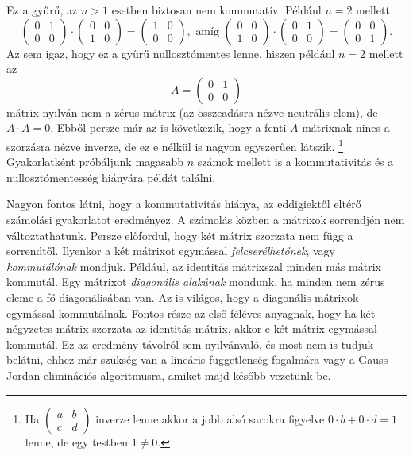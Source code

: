 \documentclass[9pt, showtrims]{memoir}
\theoremstyle{plain}
\theoremstyle{remark}
\theoremstyle{definition}
\begin{document}
Ez a gyűrű, az $n>1$ esetben biztosan nem kommutatív. 
Például $n=2$ mellett
\[
    \begin{pmatrix}
        0&1\\
        0&0
    \end{pmatrix}
    \cdot
    \begin{pmatrix}
        0&0\\
        1&0
    \end{pmatrix}
    =
    \begin{pmatrix}
        1&0\\
        0&0
    \end{pmatrix},
    \text{ amíg }
    \begin{pmatrix}
        0&0\\
        1&0
    \end{pmatrix}
    \cdot
    \begin{pmatrix}
        0&1\\
        0&0
    \end{pmatrix}
    =
    \begin{pmatrix}
        0&0\\
        0&1
    \end{pmatrix}.
\]
Az sem igaz, hogy ez a gyűrű nullosztómentes lenne, hiszen például $n=2$ mellett az
\[
    A
    =
    \begin{pmatrix}
        0&1\\
        0&0
    \end{pmatrix}
\]
mátrix nyilván nem a zérus mátrix (az összeadásra nézve neutrális elem), 
de $A\cdot A=0$. 
Ebből persze már az is következik, hogy a fenti $A$ mátrixnak nincs a szorzásra nézve inverze,
de ez e nélkül is nagyon egyszerűen látszik.%
\footnote{
    Ha 
    \(
    \begin{pmatrix}
        a&b\\
        c&d
    \end{pmatrix}
    \)
    inverze lenne akkor a jobb alsó sarokra figyelve $0\cdot b +0\cdot d=1$ lenne, de egy testben $1\neq 0$.
}
Gyakorlatként próbáljunk magasabb $n$ számok mellett is a kommutativitás és a nullosztómentesség hiányára 
példát találni.

Nagyon fontos látni, hogy a kommutativitás hiánya, az eddigiektől eltérő számolási gyakorlatot eredményez.
A számolás közben a mátrixok sorrendjén nem változtathatunk. 
Persze előfordul, hogy két mátrix szorzata nem függ a sorrendtől. 
Ilyenkor a két mátrixot egymással \emph{felcserélhetőnek}, vagy \emph{kommutálónak} mondjuk.
Például, az identitás mátrixszal minden más mátrix kommutál.
Egy mátrixot \emph{diagonális alakúnak} mondunk, 
ha minden nem zérus eleme a fő diagonálisában van.
Az is világos, hogy a diagonális mátrixok egymással kommutálnak.
Fontos része az első féléves anyagnak, hogy ha két négyzetes mátrix szorzata az identitás mátrix,
akkor e két mátrix egymással kommutál.
Ez az eredmény távolról sem nyilvánvaló, és most nem is tudjuk belátni, ehhez már szükség van a lineáris függetlenség fogalmára vagy a Gauss-Jordan eliminációs algoritmusra, 
amiket majd később vezetünk be.\label{pg:kommutal}
\end{document}
